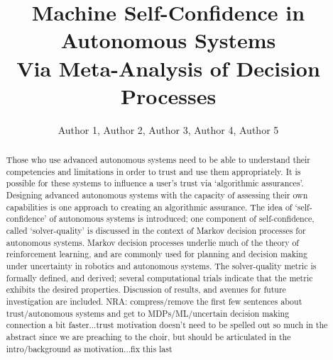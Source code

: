 \documentclass[sigconf,authordraft]{acmart}
\newcommand{\hlr}[1]{{\color{red} #1}}
\newcommand{\nisar}[1]{\hlr{NRA: #1}}
\begin{document}
\title{Machine Self-Confidence in Autonomous Systems \\ Via  Meta-Analysis of Decision Processes}%
\author{Author 1, Author 2, Author 3, Author 4, Author 5} %
\begin{abstract}
    Those who use advanced autonomous systems need to be able to understand their competencies and limitations in order to trust and use them appropriately. It is possible for these systems to influence a user's trust via `algorithmic assurances'. Designing advanced autonomous systems with the capacity of assessing their own capabilities is one approach to creating an algorithmic assurance. The idea of `self-confidence' of autonomous systems is introduced; one component of self-confidence, called `solver-quality' is discussed in the context of Markov decision processes for autonomous systems. Markov decision processes underlie much of the theory of reinforcement learning, and are commonly used for planning and decision making under uncertainty in robotics and autonomous systems. The solver-quality metric is formally defined, and derived; several computational trials indicate that the metric exhibits the desired properties. Discussion of results, and avenues for future investigation are included. \nisar{compress/remove the first few sentences about trust/autonomous systems and get to MDPs/ML/uncertain decision making connection a bit faster...trust motivation doesn't need to be spelled out so much in the abstract since we are preaching to the choir, but should be articulated in the intro/background as motivation...fix this last}
\end{abstract}
\maketitle








\end{document}
